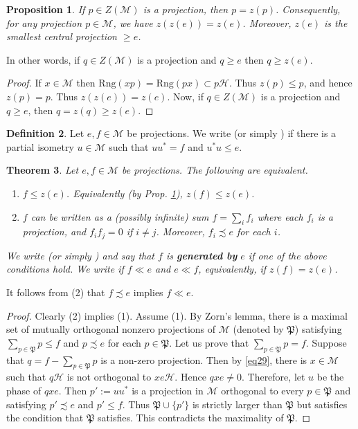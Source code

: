 \documentclass[12pt,b5paper,notitlepage]{article}
\theoremstyle{definition}
\newtheorem{df}{Definition}[section]
\theoremstyle{plain}
\newtheorem{thm}[df]{Theorem}
\newtheorem{pp}[df]{Proposition}
\newcommand{\fk}{\mathfrak}
\newcommand{\mc}{\mathcal}
\newcommand{\Rng}{\mathrm{Rng}}
\numberwithin{equation}{section}
\begin{document}
\begin{pp}\label{lb75}
If $p\in Z(\mc M)$ is a projection, then $p=z(p)$. Consequently, for any projection $p\in \mc M$, we have $z(z(e))=z(e)$. Moreover, $z(e)$ is the smallest central projection $\geq e$.
\end{pp}

In other words, if $q\in Z(\mc M)$ is a projection and $q\geq e$ then $q\geq z(e)$.


\begin{proof}
If $x\in\mc M$ then $\Rng(xp)=\Rng(px)\subset p\mc H$. Thus $z(p)\leq p$, and hence $z(p)=p$. Thus $z(z(e))=z(e)$. Now, if $q\in Z(\mc M)$ is a projection and $q\geq e$, then $q=z(q)\geq z(e)$.
\end{proof}







\begin{df}
Let $e,f\in\mc M$ be projections. We write \pmb{$f\precsim_{\mc M} e$}  (or simply )  if there is a partial isometry $u\in \mc M$ such that $uu^*=f$ and $u^*u\leq e$.
\end{df}

\begin{thm}\label{lb73}
Let $e,f\in\mc M$ be projections. The following are equivalent.
\begin{enumerate}
\item[(1)] $f\leq z(e)$. Equivalently (by Prop. \ref{lb75}), $z(f)\leq z(e)$.
\item[(2)] $f$ can be written as a (possibly infinite) sum $f=\sum_i f_i$ where each $f_i$ is a projection, and $f_if_j=0$ if $i\neq j$. Moreover, $f_i\precsim e$ for each $i$.
\end{enumerate}
We write \pmb{$f\ll_{\mc M} e$} (or simply )  and say that $f$ is \textbf{generated by} $e$ if one of the above conditions hold. We write  if $f\ll e$ and $e\ll f$, equivalently, if $z(f)=z(e)$.
\end{thm}

It follows from (2) that $f\precsim e$ implies $f\ll e$.


\begin{proof}
Clearly (2) implies (1). Assume (1). By Zorn's lemma, there is a maximal set of mutually orthogonal nonzero projections of $\mc M$ (denoted by $\fk P$) satisfying $\sum_{p\in\fk P} p\leq f$ and $p\precsim e$ for each $p\in\fk P$. Let us prove that $\sum_{p\in\fk P} p=f$. Suppose that $q=f-\sum_{p\in\fk P}p$ is a non-zero projection. Then by \eqref{eq29}, there is $x\in\mc M$ such that $q\mc H$ is not orthogonal to $xe\mc H$. Hence $qxe\neq 0$. Therefore, let $u$ be the phase of $qxe$. Then $p':=uu^*$ is a projection in $\mc M$ orthogonal to every $p\in \fk P$ and satisfying $p'\precsim e$ and $p'\leq f$. Thus $\fk P\cup\{p'\}$ is strictly larger than $\fk P$ but satisfies the condition that $\fk P$ satisfies. This contradicts the maximality of $\fk P$.
\end{proof}
\end{document}
